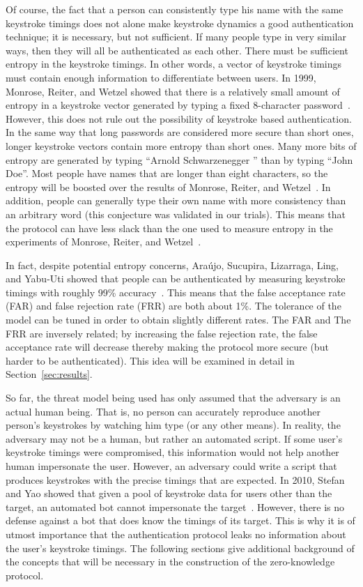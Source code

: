 \documentclass[11pt]{article}
\begin{document}
Of course, the fact that a person can consistently type his name with the same keystroke timings does not alone make keystroke dynamics a good authentication technique; it is necessary, but not sufficient. If many people type in very similar ways, then they will all be authenticated as each other. There must be sufficient entropy in the keystroke timings. In other words, a vector of keystroke timings must contain enough information to differentiate between users. In 1999, Monrose, Reiter, and Wetzel showed that there is a relatively small amount of entropy in a keystroke vector generated by typing a fixed 8-character password~\cite{Monrose:1999:PHB:319709.319720}. However, this does not rule out the possibility of keystroke based authentication. In the same way that long passwords are considered more secure than short ones, longer keystroke vectors contain more entropy than short ones. Many more bits of entropy are generated by typing ``Arnold Schwarzenegger
'' than by typing ``John Doe''. Most people have names that are longer than eight characters, so the entropy will be boosted over the results of Monrose, Reiter, and Wetzel~\cite{Monrose:1999:PHB:319709.319720}. In addition, people can generally type their own name with more consistency than an arbitrary word (this conjecture was validated in our trials). This means that the protocol can have less slack than the one used to measure entropy in the experiments of Monrose, Reiter, and Wetzel~\cite{Monrose:1999:PHB:319709.319720}.

In fact, despite potential entropy concerns, Ara\'ujo, Sucupira, Lizarraga, Ling, and Yabu-Uti showed that people can be authenticated by measuring keystroke timings with roughly 99\% accuracy~\cite{Araujo:2005:UAT:2197882.2199456}. This means that the false acceptance rate (FAR) and false rejection rate (FRR) are both about 1\%. The tolerance of the model can be tuned in order to obtain slightly different rates. The FAR and The FRR are inversely related; by increasing the false rejection rate, the false acceptance rate will decrease thereby making the protocol more secure (but harder to be authenticated). This idea will be examined in detail in Section~\ref{sec:results}.

So far, the threat model being used has only assumed that the adversary is an actual human being. That is, no person can accurately reproduce another person's keystrokes by watching him type (or any other means). In reality, the adversary may not be a human, but rather an automated script. If some user's keystroke timings were compromised, this information would not help another human impersonate the user. However, an adversary could write a script that produces keystrokes with the precise timings that are expected. In 2010, Stefan and Yao showed that given a pool of keystroke data for users other than the target, an automated bot cannot impersonate the target~\cite{conf/colcom/StefanY10}. However, there is no defense against a bot that does know the timings of its target. This is why it is of utmost importance that the authentication protocol leaks no information about the user's keystroke timings. The following sections give additional background of the concepts that will be necessary in the construction of the zero-knowledge protocol.
\end{document}
